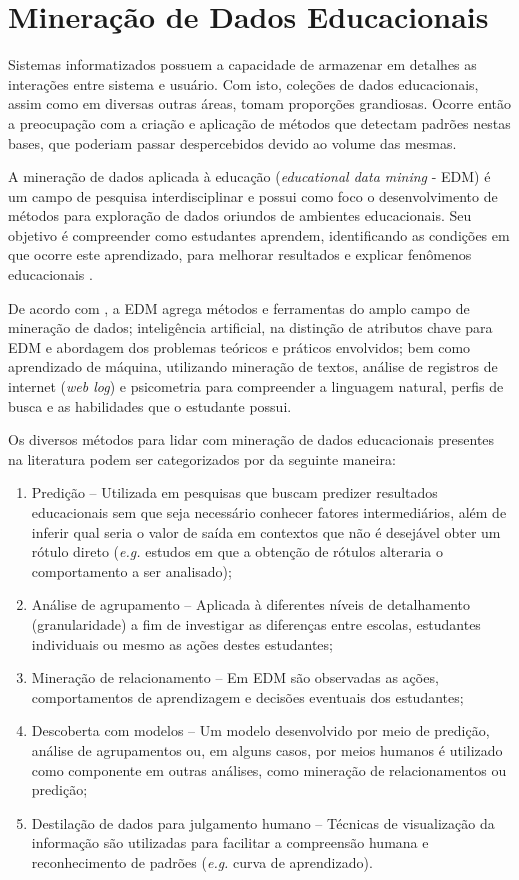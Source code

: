 \section{Mineração de Dados Educacionais}
\label{sec:edm}

Sistemas informatizados possuem a capacidade de armazenar em detalhes as interações entre sistema e usuário. Com isto, coleções de dados educacionais, assim como em diversas outras áreas, tomam proporções grandiosas. Ocorre então a preocupação com a criação e aplicação de métodos que detectam padrões nestas bases, que poderiam passar despercebidos devido ao volume das mesmas.

A mineração de dados aplicada à educação (\textit{educational data mining} - EDM) é um campo de pesquisa interdisciplinar e possui como foco o desenvolvimento de métodos para exploração de dados oriundos de ambientes educacionais. Seu objetivo é compreender como estudantes aprendem, identificando as condições em que ocorre este aprendizado, para melhorar resultados e explicar fenômenos educacionais \cite{romero2013data}.

De acordo com , a EDM agrega métodos e ferramentas do amplo campo de mineração de dados; inteligência artificial, na distinção de atributos chave para EDM e abordagem dos problemas teóricos e práticos envolvidos; bem como aprendizado de máquina, utilizando mineração de textos, análise de registros de internet (\textit{web log}) e psicometria para compreender a linguagem natural, perfis de busca e as habilidades que o estudante possui.

Os diversos métodos para lidar com mineração de dados educacionais presentes na literatura podem ser categorizados por  da seguinte maneira:

\begin{enumerate}[label=\roman*.]
    \item Predição {--} Utilizada em pesquisas que buscam predizer resultados educacionais sem que seja necessário conhecer fatores intermediários, além de inferir qual seria o valor de saída em contextos que não é desejável obter um rótulo direto (\textit{e.g.} estudos em que a obtenção de rótulos alteraria o comportamento a ser analisado);
    \item Análise de agrupamento {--} Aplicada à diferentes níveis de detalhamento (granularidade) a fim de investigar as diferenças entre escolas, estudantes individuais ou mesmo as ações destes estudantes;
    \item Mineração de relacionamento {--} Em EDM são observadas as ações, comportamentos de aprendizagem e decisões eventuais dos estudantes;
    \item Descoberta com modelos {--} Um modelo desenvolvido por meio de predição, análise de agrupamentos ou, em alguns casos, por meios humanos é utilizado como componente em outras análises, como mineração de relacionamentos ou predição;
    \item Destilação de dados para julgamento humano {--} Técnicas de visualização da informação são utilizadas para facilitar a compreensão humana e reconhecimento de padrões (\textit{e.g.} curva de aprendizado).
\end{enumerate}

